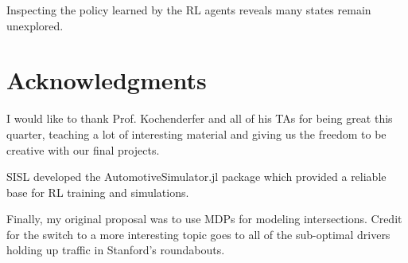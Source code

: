 \documentclass[conference]{IEEEtran}
\begin{document}
Inspecting the policy learned by the RL agents reveals many states remain unexplored.

\section*{Acknowledgments}
I would like to thank Prof. Kochenderfer and all of his TAs for being great this quarter, teaching a lot of interesting material and giving us the freedom to be creative with our final projects.

SISL developed the AutomotiveSimulator.jl package which provided a reliable base for RL training and simulations.

Finally, my original proposal was to use MDPs for modeling intersections. Credit for the switch to a more interesting topic goes to all of the sub-optimal drivers holding up traffic in Stanford's roundabouts.


\end{document}
